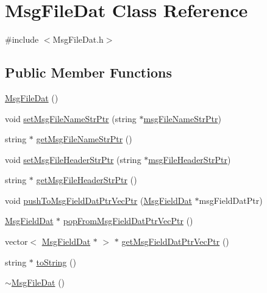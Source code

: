 \hypertarget{class_msg_file_dat}{\section{Msg\-File\-Dat Class Reference}
\label{class_msg_file_dat}
}


{\ttfamily \#include $<$Msg\-File\-Dat.\-h$>$}

\subsection*{Public Member Functions}
\begin{DoxyCompactItemize}
\item 
\hyperlink{class_msg_file_dat_a38addd578d69fa74d889997ba622787b}{Msg\-File\-Dat} ()
\item 
void \hyperlink{class_msg_file_dat_aa02e6cb780962a1b4378a5d89fd50b7c}{set\-Msg\-File\-Name\-Str\-Ptr} (string $\ast$\hyperlink{class_msg_file_dat_a219fbb888679f6785c3351d949902a05}{msg\-File\-Name\-Str\-Ptr})
\item 
string $\ast$ \hyperlink{class_msg_file_dat_a5fa4e34c1c02b27fb5555490e4259427}{get\-Msg\-File\-Name\-Str\-Ptr} ()
\item 
void \hyperlink{class_msg_file_dat_ac5ca8f3040cfb65bbed28a3299e9e71e}{set\-Msg\-File\-Header\-Str\-Ptr} (string $\ast$\hyperlink{class_msg_file_dat_a255d1a1881daf9f5d710c1c868c41a5b}{msg\-File\-Header\-Str\-Ptr})
\item 
string $\ast$ \hyperlink{class_msg_file_dat_a689fa5763f581596ce28738b78f8c6ff}{get\-Msg\-File\-Header\-Str\-Ptr} ()
\item 
void \hyperlink{class_msg_file_dat_a63d1abb4bd09980772e617aed0cdf1d0}{push\-To\-Msg\-Field\-Dat\-Ptr\-Vec\-Ptr} (\hyperlink{class_msg_field_dat}{Msg\-Field\-Dat} $\ast$msg\-Field\-Dat\-Ptr)
\item 
\hyperlink{class_msg_field_dat}{Msg\-Field\-Dat} $\ast$ \hyperlink{class_msg_file_dat_a11a9cddfd2dec07399e39caa65309a04}{pop\-From\-Msg\-Field\-Dat\-Ptr\-Vec\-Ptr} ()
\item 
vector$<$ \hyperlink{class_msg_field_dat}{Msg\-Field\-Dat} $\ast$ $>$ $\ast$ \hyperlink{class_msg_file_dat_a9e2f7cb40d2e88bc9272f94bebe4b372}{get\-Msg\-Field\-Dat\-Ptr\-Vec\-Ptr} ()
\item 
string $\ast$ \hyperlink{class_msg_file_dat_a077a61b03ad790bcd9b44f814f547502}{to\-String} ()
\item 
\hyperlink{class_msg_file_dat_a63ad4701855d00d4715ac695e0fce850}{$\sim$\-Msg\-File\-Dat} ()
\end{DoxyCompactItemize}
